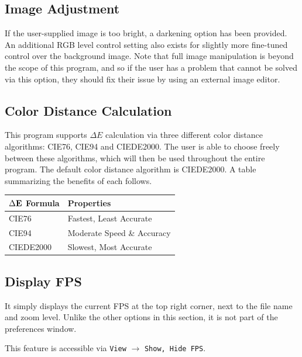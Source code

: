 \documentclass[english]{article}
\makeatletter
\newenvironment{restoretext}%
    {\@parboxrestore%
     \begin{adjustwidth}{}{\leftmargin}%
    }{\end{adjustwidth}
     }
\def\rcbegin{\begin{restoretext}\centering}
\def\rcend{\end{restoretext}}
\providecommand{\mi}[1]{\texttt{#1}}
\makeatother
\begin{document}
\subsection{Image Adjustment}

If the user-supplied image is too bright, a darkening option has been provided. An additional RGB level control setting also exists for slightly more fine-tuned control over the background image. Note that full image
manipulation is beyond the scope of this program, and so if the user has a problem that cannot be solved 
via this option, they should fix their issue by using an external image editor.

\subsection{Color Distance Calculation}

This program supports $\Delta E$ calculation via three different color distance algorithms: CIE76, CIE94 and CIEDE2000.
The user is able to choose freely between these algorithms, which will then be used throughout the entire program. The
default color distance algorithm is CIEDE2000. A table summarizing the benefits of each follows.

\vspace{1em}

\rcbegin
\begin{tabular}{|l|l|}
  \hline
  $\Delta\bf{E}$\textbf{ Formula}   & \textbf{Properties} \\
  \hline
  CIE76                             & Fastest, Least Accurate\\
  CIE94                             & Moderate Speed \& Accuracy\\
  CIEDE2000                         & Slowest, Most Accurate\\
  \hline
\end{tabular}
\rcend

\vspace{1em}

\subsection{Display FPS}

It simply displays the current FPS at the top right corner, next to the file name and zoom level.
Unlike the other options in this section, it is not part of the preferences window.

This feature is accessible via 
\mi{View} $\rightarrow$ \mi{{Show, Hide} FPS}.
\end{document}
